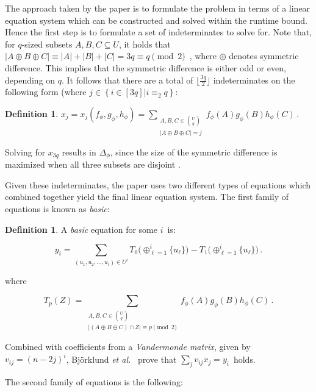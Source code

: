 \documentclass[a4paper,11pt]{report}
\theoremstyle{plain}
\theoremstyle{definition}
\newtheorem{defn}[thm]{Definition} %
\begin{document}
The approach taken by the paper is to formulate the problem in terms of a linear equation system which can be constructed and solved within the runtime bound.
Hence the first step is to formulate a set of indeterminates to solve for.
Note that, for $q$-sized subsets $A,B,C \subseteq U$, it holds that $|A\oplus B\oplus C|\equiv |A|+|B|+|C|=3q\equiv q\pmod 2\,$ \cite{BHKK13}, where $\oplus$ denotes symmetric difference.
This implies that the symmetric difference is either odd or even, depending on $q$.
It follows that there are a total of $\lfloor \frac{3q}{2} \rfloor$ indeterminates on the following form (where $j \in \left\{ i \in [3q] | i \equiv_2 q \right\}$:

\begin{defn}
$x_j=x_j(f_\phi,g_\phi,h_\phi)=\sum_{\substack{A,B,C\in\binom{U}{q}\\|A\oplus B\oplus C|=j}}
f_{\phi}(A)g_{\phi}(B)h_{\phi}(C)\,.$
\end{defn}

Solving for $x_{3q}$ results in $\Delta_\phi$, since the size of the symmetric difference is maximized when all three subsets are disjoint \cite{BHKK13}. 

Given these indeterminates, the paper uses two different types of equations which combined together yield the final linear equation system.
The first family of equations is known as \emph{basic}:

\begin{defn}
A \emph{basic} equation for some $i$ is:

\begin{equation}
\label{eq:yi}
y_i=
\sum_{(u_1,u_2,\ldots,u_i)\in U^i}
T_0\bigl(\oplus_{\ell=1}^i\{u_\ell\}\bigr)
-T_1\bigl(\oplus_{\ell=1}^i\{u_\ell\}\bigr)\,.
\end{equation}

where

\begin{equation}
T_p(Z)=
\sum_{\substack{A,B,C\in\binom{U}{q}\\|(A\oplus B\oplus C)\cap Z|\equiv p\!\!\!\pmod 2}}
f_\phi(A)g_\phi(B)h_\phi(C)\,.
\end{equation}
\end{defn}

Combined with coefficients from a \emph{Vandermonde matrix}, given by $v_{ij} = (n - 2j)^i$, Bj\"orklund \emph{et al.}~\cite{BHKK13} prove that $\sum_j v_{ij}x_{j} = y_i$ holds.

The second family of equations is the following:
\end{document}
